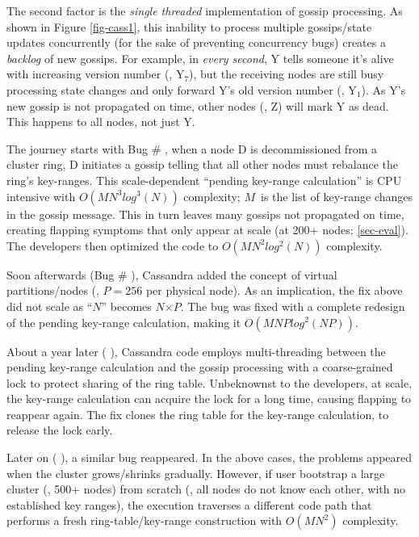 The second factor is the {\em single threaded} implementation of gossip
processing. As shown in Figure \ref{fig-cass1},  this inability to process
multiple gossips/state updates concurrently (for the sake of preventing
concurrency bugs) creates a {\em backlog} of new gossips.  For example, in {\em
every second}, Y tells someone it's alive with increasing version number (\eg,
Y$_7$), but the receiving nodes are still busy processing state changes and
only forward Y's old version number (\eg, Y$_1$).  As Y's new gossip is not
propagated on time,  other nodes (\eg, Z) will mark Y as dead.  This happens to
all nodes, not just Y.

The journey starts with Bug \# \cite{CA-Two}, when a node D is
decommissioned from a cluster ring, D initiates a gossip telling that all other
nodes must rebalance the ring's key-ranges.  This scale-dependent ``pending
key-range calculation'' is CPU intensive with
%
$O(MN^3log^3(N))$  %
%
complexity; $M$~is the list of key-range changes in the gossip message.  This
in turn leaves many gossips not propagated on time, creating flapping symptoms
that only appear at scale (at 200+ nodes; \sec\ref{sec-eval}). The developers
then optimized the code to
%
$O(MN^2log^2(N))$ complexity.



Soon afterwards (Bug \# \cite{CA-Tri}), Cassandra added the concept of
virtual partitions/nodes (\eg, $P$$=$$256$ per physical node).  As an
implication, the fix above did not scale as ``$N$'' becomes $N$$\times$$P$.
%
The bug was fixed with a complete redesign of the pending key-range
calculation, making it
$O(MNPlog^2(NP))$.

About a year later ( \cite{CA-Four}), Cassandra code employs
multi-threading between the pending key-range calculation and the gossip
processing with a coarse-grained lock to protect sharing of the ring
table.  Unbeknownst to the developers, at scale, the key-range calculation
can acquire the lock for a long time, causing flapping to reappear again.
The fix clones the ring table for the key-range calculation, to release the
lock early.



Later on ( \cite{CA-One}), a similar bug reappeared.  In the above
cases, the problems appeared when the cluster grows/shrinks gradually.
However, if user bootstrap a large cluster (\eg, 500+ nodes) from
scratch (\ie, all nodes do not know each other, with no established
key ranges),
%
the execution traverses a different code path that
performs a fresh ring-table/key-range construction with
$O(MN^2)$ %
complexity.

